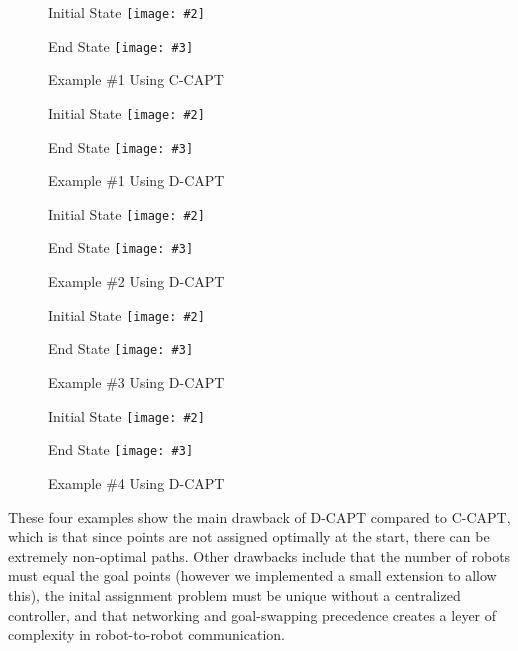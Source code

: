\newcommand{\twofigure}[3]{
\begin{figure}[H]
\caption{#1}
\begin{minipage}[t]{0.45\linewidth}
\center
Initial State
\texttt{[image: \#2]}
\end{minipage}
\begin{minipage}[t]{0.45\linewidth}
\center
End State
\texttt{[image: \#3]}
\end{minipage}
\end{figure}
}

\twofigure{Example \#1 Using C-CAPT}{images/ccapt2d_cascade_start.png}{images/ccapt2d_cascade_goal.png}
\twofigure{Example \#1 Using D-CAPT}{images/dcapt2d_cascade_start.png}{images/dcapt2d_cascade_goal.png}
\twofigure{Example \#2 Using D-CAPT}{images/dcapt2d_circlebounce_start.png}{images/dcapt2d_circlebounce_goal.png}
\twofigure{Example \#3 Using D-CAPT}{images/dcapt2d_doublebounce_start.png}{images/dcapt2d_doublebounce_goal.png}
\twofigure{Example \#4 Using D-CAPT}{images/dcapt2d_pool_start.png}{images/dcapt2d_pool_goal.png}



These four examples show the main drawback of D-CAPT compared to C-CAPT, which is that since points are not assigned optimally at the start, there can be extremely non-optimal paths. Other drawbacks include that the number of robots must equal the goal points (however we implemented a small extension to allow this), the inital assignment problem must be unique without a centralized controller, and that networking and goal-swapping precedence creates a leyer of complexity in robot-to-robot communication.